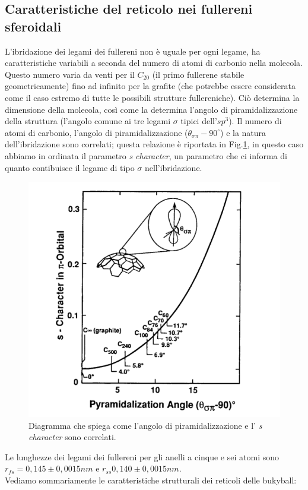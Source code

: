 \documentclass[a4paper,titlepage]{book}
\begin{document}
\subsection{Caratteristiche del reticolo nei fullereni sferoidali}
L'ibridazione dei legami dei fullereni non è uguale per ogni legame, ha caratteristiche variabili a seconda del numero di atomi di carbonio nella molecola. Questo numero varia da venti per il $C_{20}$ (il primo fullerene stabile geometricamente) fino ad infinito per la grafite (che potrebbe essere considerata come il caso estremo di tutte le possibili strutture fullereniche). Ciò determina la dimensione della molecola, così come la determina l'angolo di piramidalizzazione della struttura (l'angolo comune ai tre legami $\sigma$ tipici dell'$sp^3$). Il numero di atomi di carbonio, l'angolo di piramidalizzazione ($\theta_{\sigma\pi}-90^\circ$) e la natura dell'ibridazione sono correlati; questa relazione è riportata in Fig.\ref{dia}, in questo caso abbiamo in ordinata il parametro \textit{s character}, un parametro che ci informa di quanto contibuisce il legame di tipo $\sigma$ nell'ibridazione.
\begin{figure}[h!] 
	\centering
	\includegraphics[width=0.7\columnwidth]{anglediag.png}
	\caption{ 	\label{dia}
		Diagramma che spiega come l'angolo di piramidalizzazione e l' \textit{s character} sono correlati.
	}
\end{figure}
Le lunghezze dei legami dei fullereni per gli anelli a cinque e sei atomi sono $r_{fs}=0,145 \pm 0,0015 nm$ e $r_{ss}0,140 \pm 0,0015 nm$. \\
Vediamo sommariamente le caratteristiche strutturali dei reticoli delle bukyball:
\end{document}
